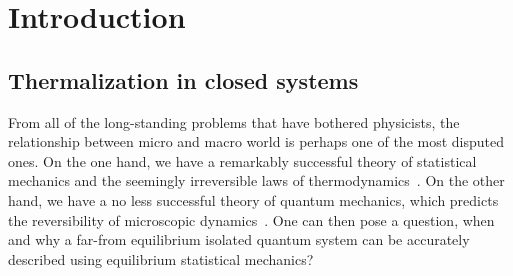 \chapter{Introduction}
\thispagestyle{chapterBeginStyle}

\section{Thermalization in closed systems}
From all of the long-standing problems that have bothered physicists, the relationship
between micro and macro world is perhaps one of the most disputed ones. On the one
hand, we have a remarkably successful theory of statistical mechanics and the seemingly
irreversible laws of thermodynamics~\autocite{huang1987statistical,Feynman1972}.
On the other hand, we have a no less successful theory of quantum mechanics,
which predicts the reversibility of microscopic dynamics~\autocite{landau1991quantum,Sakurai2017}.
One can then pose a question, when and why a far-from equilibrium isolated quantum system
can be accurately described using equilibrium statistical mechanics?

